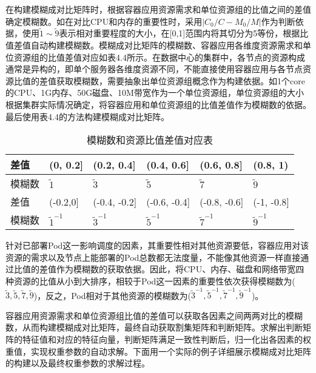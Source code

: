 在构建模糊成对比矩阵时，根据容器应用资源需求和单位资源组的比值之间的差值确定模糊数。如在对比CPU和内存的重要性时，采用$|C_{0}/C-M_{0}/M|$作为判断依据，使用$\widetilde{1}\sim\widetilde{9}$表示相对重要程度的大小，在[0,1]范围内将其切分为5等份，根据比值差值自动构建模糊数。模糊成对比矩阵的模糊数、容器应用各维度资源需求和单位资源组的比值差值对应如表4.4所示。在数据中心的集群中，各节点的资源构成通常是异构的，即单个服务器各维度资源不同，不能直接使用容器应用与各节点资源比值的差值获取模糊数，需要抽象出单位资源组概念作为构建依据。如1个core的CPU、1G内存、50G磁盘、10M带宽作为一个单位资源组，单位资源组的大小根据集群实际情况确定，将容器应用和单位资源组的比值差值作为模糊数的依据。最后使用表4.4的方法构建模糊成对比矩阵。
\begin{table}[htbp]
	\centering\dawu[1.3]
	\caption{模糊数和资源比值差值对应表}
	\begin{tabular}{|p{1.8cm}<{\centering}|p{1.8cm}<{\centering}|p{1.8cm}<{\centering}|p{1.8cm}<{\centering}|p{1.8cm}<{\centering}|p{1.8cm}<{\centering}|} \hline
		差值 & (0, 0.2] & (0.2, 0.4] & (0.4, 0.6] & (0.6, 0.8] & (0.8, 1) \\ \hline
		模糊数 & $\widetilde{1}$ & $\widetilde{3}$ & $\widetilde{5}$ & $\widetilde{7}$  & $\widetilde{9}$  \\ \hline
		差值 & (-0.2,0] & (-0.4, -0.2] & (-0.6, -0.4] & (-0.8, -0.6] & (-1, -0.8]  \\ \hline
		模糊数 & $\widetilde{1}^{-1}$ & $\widetilde{3}^{-1}$ & $\widetilde{5}^{-1}$ & $\widetilde{7}^{-1}$ & $\widetilde{9}^{-1}$  \\ \hline
	\end{tabular}
\end{table}

针对已部署Pod这一影响调度的因素，其重要性相对其他资源要低，容器应用对该资源的需求以及节点上能部署的Pod总数都无法度量，不能像其他资源一样直接通过比值的差值作为模糊数的获取依据。因此，将CPU、内存、磁盘和网络带宽四种资源的比值从小到大排序，相较于Pod这一因素的重要性依次获得模糊数为(${\widetilde{3},\widetilde{5},\widetilde{7},\widetilde{9}}$)，反之，Pod相对于其他资源的模糊数为(${\widetilde{3}^{-1},\widetilde{5}^{-1},\widetilde{7}^{-1},\widetilde{9}^{-1}}$)。

容器应用资源需求和单位资源组比值的差值可以获取各因素之间两两对比的模糊数，从而构建模糊成对比矩阵，最终自动获取割集矩阵和判断矩阵。求解出判断矩阵的特征值和对应的特征向量，判断矩阵满足一致性判断后，归一化出各因素的权重值，实现权重参数的自动求解。下面用一个实际的例子详细展示模糊成对比矩阵的构建以及最终权重参数的求解过程。

